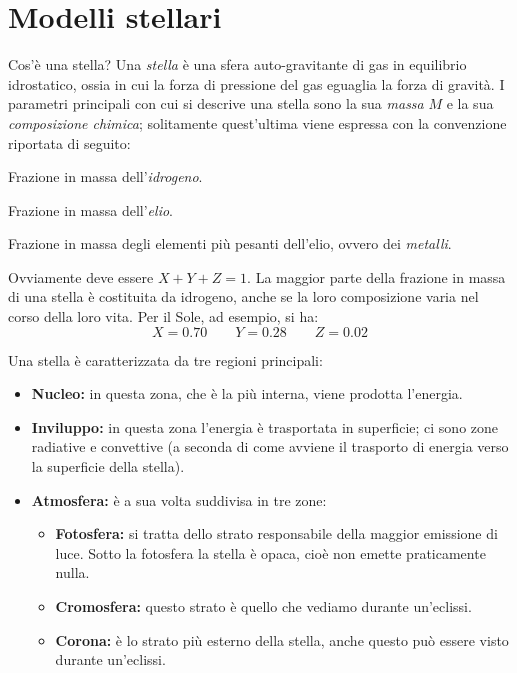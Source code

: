 \section{Modelli stellari}\label{sec:modelli-stellari}
Cos'è una stella? Una \emph{stella} è una sfera auto-gravitante di gas in equilibrio idrostatico, ossia in cui la forza di pressione del gas eguaglia la forza di gravità. I parametri principali con cui si descrive una stella sono la sua \emph{massa} $M$ e la sua \emph{composizione chimica}; solitamente quest'ultima viene espressa con la convenzione riportata di seguito:
\begin{description}\label{tab:composizione-chimica}
    \item[X] Frazione in massa dell'\emph{idrogeno}.
    \item[Y] Frazione in massa dell'\emph{elio}.
    \item[Z] Frazione in massa degli elementi più pesanti dell'elio, ovvero dei \emph{metalli}.
\end{description}
Ovviamente deve essere $X + Y + Z = 1$. La maggior parte della frazione in massa di una stella è costituita da idrogeno, anche se la loro composizione varia nel corso della loro vita. Per il Sole, ad esempio, si ha:
\[
    X=0.70 \qquad Y=0.28 \qquad Z=0.02
\]

Una stella è caratterizzata da tre regioni principali:
\begin{itemize}
    \item \textbf{Nucleo:} in questa zona, che è la più interna, viene prodotta l'energia.
    \item \textbf{Inviluppo:} in questa zona l'energia è trasportata in superficie; ci sono zone radiative e convettive (a seconda di come avviene il trasporto di energia verso la superficie della stella).
    \item \textbf{Atmosfera:} è a sua volta suddivisa in tre zone:
    \begin{itemize}
        \item \textbf{Fotosfera:} si tratta dello strato responsabile della maggior emissione di luce. Sotto la fotosfera la stella è opaca, cioè non emette praticamente nulla.
        \item \textbf{Cromosfera:} questo strato è quello che vediamo durante un'eclissi.
        \item \textbf{Corona:} è lo strato più esterno della stella, anche questo può essere visto durante un'eclissi.
    \end{itemize}
\end{itemize}

